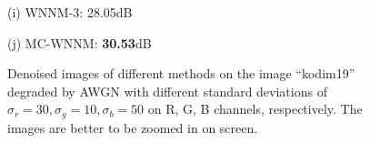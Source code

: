 \documentclass[10pt,onecolumn,letterpaper]{article}
\begin{document}
\begin{figure}[!htbp]
{\begin{minipage}[t]{0.24\textwidth}
{\footnotesize (i) WNNM-3: 28.05dB }
\end{minipage}
\begin{minipage}[t]{0.24\textwidth}
\centering
{}
{\footnotesize (j) MC-WNNM: \textbf{30.53}dB}
\end{minipage}
}
\caption{Denoised images of different methods on the image ``kodim19'' degraded by AWGN with different standard deviations of $\sigma_{r}=30, \sigma_{g}=10, \sigma_{b}=50$ on R, G, B channels, respectively. The images are better to be zoomed in on screen.}
\label{f4}
\end{figure}
\end{document}
